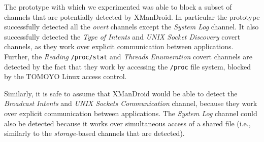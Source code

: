 

The prototype with which we experimented was able to block a subset of
channels that are potentially detected by XManDroid. In particular the
prototype successfully detected all the \emph{overt} channels except
the \emph{System Log} channel. It also successfully detected the
\emph{Type of Intents} and \emph{UNIX Socket Discovery} covert
channels, as they work over explicit communication between
applications. Further, the \emph{Reading} \texttt{/proc/stat} and
\emph{Threads Enumeration} covert channels are detected by the fact
that they work by accessing the \texttt{/proc} file system, blocked by
the TOMOYO Linux access control.


Similarly, it is safe to assume that XManDroid would be able to detect
the \emph{Broadcast Intents} and \emph{UNIX Sockets Communication}
channel, because they work over explicit communication between
applications. The \emph{System Log} channel could also be detected
because it works over simultaneous access of a shared file (i.e.,
similarly to the \emph{storage}-based channels that are detected).

